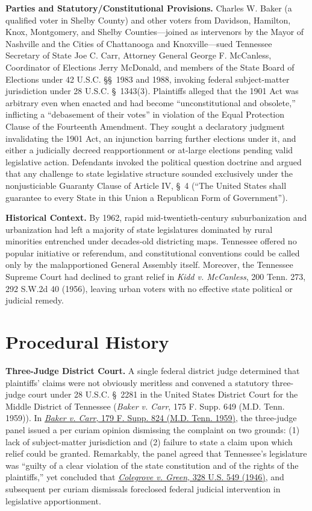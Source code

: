\documentclass[12pt]{article}
\begin{document}
\textbf{Parties and Statutory/Constitutional Provisions.} Charles W. Baker (a qualified voter in Shelby County) and other voters from Davidson, Hamilton, Knox, Montgomery, and Shelby Counties---joined as intervenors by the Mayor of Nashville and the Cities of Chattanooga and Knoxville---sued Tennessee Secretary of State Joe C. Carr, Attorney General George F. McCanless, Coordinator of Elections Jerry McDonald, and members of the State Board of Elections under 42 U.S.C. \S\S~1983 and 1988, invoking federal subject-matter jurisdiction under 28 U.S.C. \S~1343(3). Plaintiffs alleged that the 1901 Act was arbitrary even when enacted and had become ``unconstitutional and obsolete,'' inflicting a ``debasement of their votes'' in violation of the Equal Protection Clause of the Fourteenth Amendment. They sought a declaratory judgment invalidating the 1901 Act, an injunction barring further elections under it, and either a judicially decreed reapportionment or at-large elections pending valid legislative action. Defendants invoked the political question doctrine and argued that any challenge to state legislative structure sounded exclusively under the nonjusticiable Guaranty Clause of Article IV, \S~4 (``The United States shall guarantee to every State in this Union a Republican Form of Government'').

\textbf{Historical Context.} By 1962, rapid mid-twentieth-century suburbanization and urbanization had left a majority of state legislatures dominated by rural minorities entrenched under decades-old districting maps. Tennessee offered no popular initiative or referendum, and constitutional conventions could be called only by the malapportioned General Assembly itself. Moreover, the Tennessee Supreme Court had declined to grant relief in \textit{Kidd v. McCanless}, 200 Tenn. 273, 292 S.W.2d 40 (1956), leaving urban voters with no effective state political or judicial remedy.

\section{Procedural History}

\textbf{Three-Judge District Court.} A single federal district judge determined that plaintiffs' claims were not obviously meritless and convened a statutory three-judge court under 28 U.S.C. \S~2281 in the United States District Court for the Middle District of Tennessee (\textit{Baker v. Carr}, 175 F. Supp. 649 (M.D. Tenn. 1959)). In \href{https://law.justia.com/cases/federal/district-courts/FSupp/179/824/1522687/}{\textit{Baker v. Carr}, 179 F. Supp. 824 (M.D. Tenn. 1959)}, the three-judge panel issued a per curiam opinion dismissing the complaint on two grounds: (1) lack of subject-matter jurisdiction and (2) failure to state a claim upon which relief could be granted. Remarkably, the panel agreed that Tennessee's legislature was ``guilty of a clear violation of the state constitution and of the rights of the plaintiffs,'' yet concluded that \href{https://supreme.justia.com/cases/federal/us/328/549/}{\textit{Colegrove v. Green}, 328 U.S. 549 (1946)}, and subsequent per curiam dismissals foreclosed federal judicial intervention in legislative apportionment.
\end{document}
